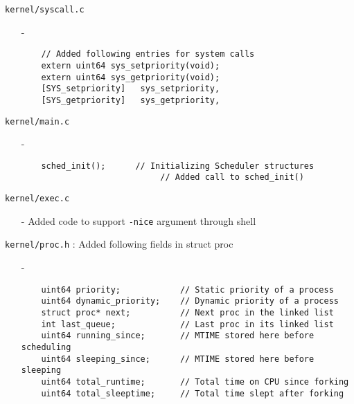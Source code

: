 \documentclass[11pt]{article}
\begin{document}
\texttt{kernel/syscall.c}
\begin{enumerate}
    \item[-]\begin{verbatim}
    // Added following entries for system calls
    extern uint64 sys_setpriority(void);
    extern uint64 sys_getpriority(void);
    [SYS_setpriority]   sys_setpriority,
    [SYS_getpriority]   sys_getpriority,
    \end{verbatim}
\end{enumerate}

\texttt{kernel/main.c}
\begin{enumerate}
    \item[-]\begin{verbatim}
    sched_init();	   // Initializing Scheduler structures
                            // Added call to sched_init()
    \end{verbatim}
\end{enumerate}

\texttt{kernel/exec.c}
\begin{enumerate}
    \item[-]
    Added code to support \texttt{-nice} argument through shell
\end{enumerate}

\texttt{kernel/proc.h} : Added following fields in struct proc
\begin{enumerate}
    \item[-]\begin{verbatim}
    uint64 priority;            // Static priority of a process
    uint64 dynamic_priority;    // Dynamic priority of a process
    struct proc* next;          // Next proc in the linked list
    int last_queue;             // Last proc in its linked list
    uint64 running_since;       // MTIME stored here before scheduling
    uint64 sleeping_since;      // MTIME stored here before sleeping
    uint64 total_runtime;       // Total time on CPU since forking
    uint64 total_sleeptime;     // Total time slept after forking
    \end{verbatim}
\end{enumerate}
\end{document}
